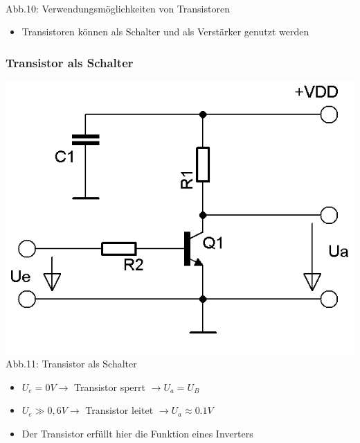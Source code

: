 \begin{frame}
\begin{minipage}{0.4\textwidth}
\begin{center}
		\end{center}	
	\end{minipage}\\
	\vspace{3mm}
	Abb.10: Verwendungsmöglichkeiten von Transistoren \cite{bnetza}
	\begin{itemize}
		\item	Transistoren können als Schalter und als Verstärker genutzt werden
	\end{itemize}
\end{frame}

\begin{frame}
	\frametitle{Transistor als Schalter}
	\begin{center}
			\includegraphics[scale=1.2]{a06/Transistor-Schalter.png}\\
			Abb.11: Transistor als Schalter \cite{bnetza}
		\end{center}
		\begin{itemize}
			\item	$U_e = 0 V \rightarrow$ Transistor sperrt $\rightarrow U_a = U_B$
			\item	$U_e \gg 0,6 V \rightarrow$ Transistor leitet $\rightarrow U_a \approx 0.1 V$
			\item	Der Transistor erfüllt hier die Funktion eines Inverters
		\end{itemize}
\end{frame}

